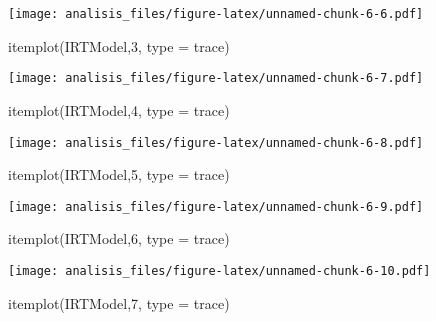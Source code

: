 \documentclass[
]{article}
\newenvironment{Shaded}{\begin{snugshade}}{\end{snugshade}}
\newcommand{\AttributeTok}[1]{\textcolor[rgb]{0.77,0.63,0.00}{#1}}
\newcommand{\DecValTok}[1]{\textcolor[rgb]{0.00,0.00,0.81}{#1}}
\newcommand{\FunctionTok}[1]{\textcolor[rgb]{0.00,0.00,0.00}{#1}}
\newcommand{\NormalTok}[1]{#1}
\newcommand{\StringTok}[1]{\textcolor[rgb]{0.31,0.60,0.02}{#1}}
\begin{document}
\texttt{[image: analisis\_files/figure-latex/unnamed-chunk-6-6.pdf]}

\begin{Shaded}
\begin{Highlighting}[]
\FunctionTok{itemplot}\NormalTok{(IRTModel,}\DecValTok{3}\NormalTok{, }\AttributeTok{type =} \StringTok{\textquotesingle{}trace\textquotesingle{}}\NormalTok{)}
\end{Highlighting}
\end{Shaded}

\texttt{[image: analisis\_files/figure-latex/unnamed-chunk-6-7.pdf]}

\begin{Shaded}
\begin{Highlighting}[]
\FunctionTok{itemplot}\NormalTok{(IRTModel,}\DecValTok{4}\NormalTok{, }\AttributeTok{type =} \StringTok{\textquotesingle{}trace\textquotesingle{}}\NormalTok{)}
\end{Highlighting}
\end{Shaded}

\texttt{[image: analisis\_files/figure-latex/unnamed-chunk-6-8.pdf]}

\begin{Shaded}
\begin{Highlighting}[]
\FunctionTok{itemplot}\NormalTok{(IRTModel,}\DecValTok{5}\NormalTok{, }\AttributeTok{type =} \StringTok{\textquotesingle{}trace\textquotesingle{}}\NormalTok{)}
\end{Highlighting}
\end{Shaded}

\texttt{[image: analisis\_files/figure-latex/unnamed-chunk-6-9.pdf]}

\begin{Shaded}
\begin{Highlighting}[]
\FunctionTok{itemplot}\NormalTok{(IRTModel,}\DecValTok{6}\NormalTok{, }\AttributeTok{type =} \StringTok{\textquotesingle{}trace\textquotesingle{}}\NormalTok{)}
\end{Highlighting}
\end{Shaded}

\texttt{[image: analisis\_files/figure-latex/unnamed-chunk-6-10.pdf]}

\begin{Shaded}
\begin{Highlighting}[]
\FunctionTok{itemplot}\NormalTok{(IRTModel,}\DecValTok{7}\NormalTok{, }\AttributeTok{type =} \StringTok{\textquotesingle{}trace\textquotesingle{}}\NormalTok{)}
\end{Highlighting}
\end{Shaded}
\end{document}
